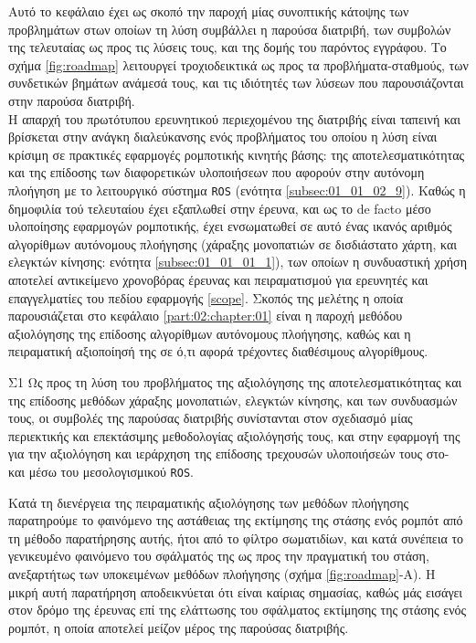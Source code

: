 Αυτό το κεφάλαιο έχει ως σκοπό την παροχή μίας συνοπτικής κάτοψης των
προβλημάτων στων οποίων τη λύση συμβάλλει η παρούσα διατριβή, των συμβολών της
τελευταίας ως προς τις λύσεις τους, και της δομής του παρόντος εγγράφου. Το
σχήμα \ref{fig:roadmap} λειτουργεί τροχιοδεικτικά ως προς τα
προβλήματα-σταθμούς, των συνδετικών βημάτων ανάμεσά τους, και τις ιδιότητές των
λύσεων που παρουσιάζονται στην παρούσα διατριβή.\\

Η απαρχή του πρωτότυπου ερευνητικού περιεχομένου της διατριβής είναι ταπεινή
και βρίσκεται στην ανάγκη διαλεύκανσης ενός προβλήματος του οποίου η λύση είναι
κρίσιμη σε πρακτικές εφαρμογές ρομποτικής κινητής βάσης: της
αποτελεσματικότητας και της επίδοσης των διαφορετικών υλοποιήσεων που αφορούν
στην αυτόνομη πλοήγηση με το λειτουργικό σύστημα \texttt{ROS} (ενότητα
\ref{subsec:01_01_02_9}). Καθώς η δημοφιλία τού τελευταίου έχει εξαπλωθεί στην
έρευνα, και ως το de facto μέσο υλοποίησης εφαρμογών ρομποτικής, έχει
ενσωματωθεί σε αυτό ένας ικανός αριθμός αλγορίθμων αυτόνομους πλοήγησης
(χάραξης μονοπατιών σε δισδιάστατο χάρτη, και ελεγκτών κίνησης: ενότητα
\ref{subsec:01_01_01_1}), των οποίων η συνδυαστική χρήση αποτελεί αντικείμενο
χρονοβόρας έρευνας και πειραματισμού για ερευνητές και επαγγελματίες του πεδίου
εφαρμογής \ref{scope}. Σκοπός της μελέτης η οποία παρουσιάζεται στο κεφάλαιο
\ref{part:02:chapter:01} είναι η παροχή μεθόδου αξιολόγησης της επίδοσης
αλγορίθμων αυτόνομους πλοήγησης, καθώς και η πειραματική αξιοποίησή της σε ό,τι
αφορά τρέχοντες διαθέσιμους αλγορίθμους.

\begin{bw_box}
\begin{customcontribution}{Σ1}
  \label{contribution:01}
  Ως προς τη λύση του προβλήματος της αξιολόγησης της αποτελεσματικότητας και
  της επίδοσης μεθόδων χάραξης μονοπατιών, ελεγκτών κίνησης, και των συνδυασμών
  τους, οι συμβολές της παρούσας διατριβής συνίστανται στον σχεδιασμό μίας
  περιεκτικής και επεκτάσιμης μεθοδολογίας αξιολόγησής τους, και στην εφαρμογή
  της για την αξιολόγηση και ιεράρχηση της επίδοσης τρεχουσών υλοποιήσεών τους
  στο- και μέσω του μεσολογισμικού \texttt{ROS}. \cite{Filotheou2020b}
\end{customcontribution}
\end{bw_box}

Κατά τη διενέργεια της πειραματικής αξιολόγησης των μεθόδων πλοήγησης
παρατηρούμε το φαινόμενο της αστάθειας της εκτίμησης της στάσης ενός ρομπότ από
τη μέθοδο παρατήρησης αυτής, ήτοι από το φίλτρο σωματιδίων, και κατά συνέπεια
το γενικευμένο φαινόμενο του σφάλματός της ως προς την πραγματική του στάση,
ανεξαρτήτως των υποκειμένων μεθόδων πλοήγησης (σχήμα \ref{fig:roadmap}-Α). Η
μικρή αυτή παρατήρηση αποδεικνύεται ότι είναι καίριας σημασίας, καθώς μάς
εισάγει στον δρόμο της έρευνας επί της ελάττωσης του σφάλματος εκτίμησης της
στάσης ενός ρομπότ, η οποία αποτελεί μείζον μέρος της παρούσας διατριβής.\\

